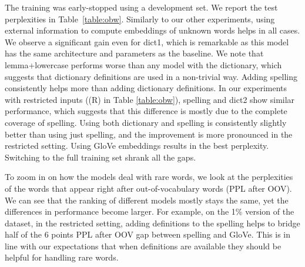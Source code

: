 The training was early-stopped using a development set. We report the test perplexities in Table~\ref{table:obw}. Similarly to our other experiments, using external information to compute embeddings of unknown words helps in all cases. We observe a significant gain even for dict1, which is remarkable as this model has the same architecture  and parameters as the baseline. We note that lemma+lowercase performs worse than any model with the dictionary, which suggests that  dictionary definitions are used in a non-trivial way. Adding spelling consistently helps more than adding dictionary definitions. In our experiments with restricted inputs ((R) in Table \ref{table:obw}), spelling and dict2 show similar performance, which suggests that this difference is mostly due to the complete coverage of spelling. Using both dictionary and spelling is consistently slightly better than using just spelling, and the improvement is more pronounced in the restricted setting. Using GloVe embeddings results in the best perplexity. Switching to the full training set shrank all the gaps. 



To zoom in on how the models deal with rare words, we look at the perplexities of the words that appear right after out-of-vocabulary words (PPL after OOV). We can see that the ranking of different models mostly stays the same, yet the differences in performance become larger. For example, on the 1\% version of the dataset, in the restricted setting, adding definitions to the spelling helps to bridge half of the 6 points PPL after OOV gap between spelling and GloVe. This is in line with our expectations that when definitions are available they should be helpful for handling rare words.

